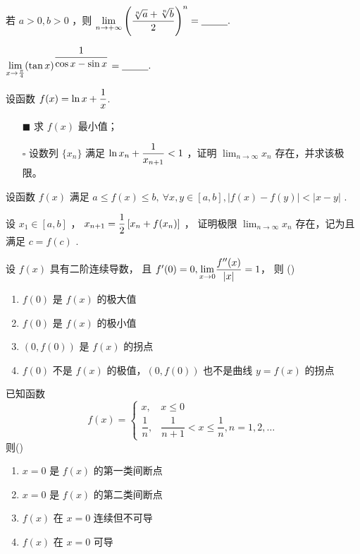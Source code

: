 \begin{Quest}[C1T15\goto{T4}]
    若 $ a>0,b>0 $ ，则 $ \displaystyle {\displaystyle\lim_{n\rightarrow +\infty}}
    \left(\frac{\sqrt[n]a+\sqrt[n]b}{2}\right)^n = \underline{~~~~~~~~}. $ 
\end{Quest}

\begin{Quest}[C1T16\goto{T5}]
    $ \displaystyle {\displaystyle\lim_{x\rightarrow \frac{\pi}{4}}}(\tan x)^{\displaystyle\frac{1}{\cos x-\sin x}} = \underline{~~~~~~~~}. $ 
\end{Quest}

\begin{Quest}[C1T20\goto{T6}]
    设函数 $\displaystyle f(x)=\ln x + \frac{1}{x} $.
    \begin{itemize}
        \item[$ \blacksquare $ ] 求 $ f(x) $ 最小值；
        \item[$ \square $ ] 设数列 $ \{x_n\} $ 满足 $ \displaystyle \ln x_n + \frac{1}{x_{n+1}}<1 $ ，证明
        $ {\displaystyle\lim_{n\rightarrow \infty}}x_n $ 存在，并求该极限。
    \end{itemize}
\end{Quest}

\begin{Quest}[C1T22\goto{T7}]
    设函数 $ f(x) $ 满足 $a \leq f(x)\leq b,\ \forall x,y\in [a,b],|f(x)-f(y)|<|x-y|  $ .

    设 $ x_1\in[a,b] $ ， $\displaystyle x_{n+1}=\frac{1}{2}\left[x_n+f(x_n)\right] $ ，
    证明极限 $ {\displaystyle\lim_{n\rightarrow \infty}}x_n $ 存在，记为且满足
    $ c=f(c) $ .
\end{Quest}

\begin{quest}[C2T1]
    设 $ f(x) $ 具有二阶连续导数，
    且 $ f'(0) = 0,{\displaystyle\lim_{x\rightarrow 0}}\dfrac{f^{\prime\prime}(x)}{|x|} = 1 $，
    则 ()
    \begin{enumerate}
        \item $ f(0) $ 是 $ f(x) $ 的极大值
        \item $ f(0) $ 是 $ f(x) $ 的极小值
        \item $ (0,f(0)) $ 是 $ f(x) $ 的拐点
        \item $ f(0) $ 不是 $ f(x) $ 的极值，$ (0,f(0)) $ 也不是曲线 $ y=f(x) $ 的拐点
    \end{enumerate} 
\end{quest}


\begin{quest}[C2T8]
    已知函数$$
    f(x) = \begin{cases}
        x,&x\leq 0\\
        \dfrac{1}{n},&\dfrac{1}{n+1}<x\leq \dfrac{1}{n}, n = 1,2,\dots
    \end{cases}
$$ 则()
\begin{enumerate}
    \item $ x=0 $ 是 $ f(x) $ 的第一类间断点
    \item $ x=0 $ 是 $ f(x) $ 的第二类间断点
    \item $ f(x) $ 在 $ x=0 $ 连续但不可导
    \item $ f(x) $ 在 $ x=0 $ 可导
\end{enumerate}
\end{quest}

